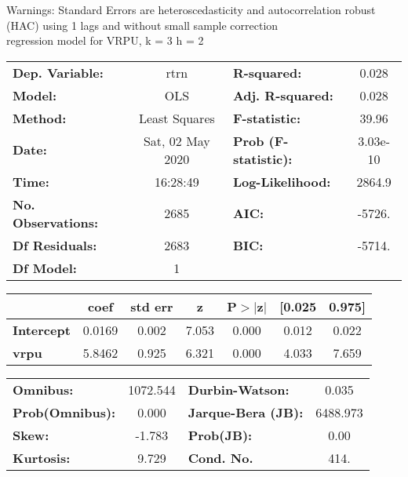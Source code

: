 Warnings: \newline
 [1] Standard Errors are heteroscedasticity and autocorrelation robust (HAC) using 1 lags and without small sample correction\\ 

regression model for VRPU, k = 3 h = 2\begin{center}
\begin{tabular}{lclc}
\toprule
\textbf{Dep. Variable:}    &       rtrn       & \textbf{  R-squared:         } &     0.028   \\
\textbf{Model:}            &       OLS        & \textbf{  Adj. R-squared:    } &     0.028   \\
\textbf{Method:}           &  Least Squares   & \textbf{  F-statistic:       } &     39.96   \\
\textbf{Date:}             & Sat, 02 May 2020 & \textbf{  Prob (F-statistic):} &  3.03e-10   \\
\textbf{Time:}             &     16:28:49     & \textbf{  Log-Likelihood:    } &    2864.9   \\
\textbf{No. Observations:} &        2685      & \textbf{  AIC:               } &    -5726.   \\
\textbf{Df Residuals:}     &        2683      & \textbf{  BIC:               } &    -5714.   \\
\textbf{Df Model:}         &           1      & \textbf{                     } &             \\
\bottomrule
\end{tabular}
\begin{tabular}{lcccccc}
                   & \textbf{coef} & \textbf{std err} & \textbf{z} & \textbf{P$> |$z$|$} & \textbf{[0.025} & \textbf{0.975]}  \\
\midrule
\textbf{Intercept} &       0.0169  &        0.002     &     7.053  &         0.000        &        0.012    &        0.022     \\
\textbf{vrpu}      &       5.8462  &        0.925     &     6.321  &         0.000        &        4.033    &        7.659     \\
\bottomrule
\end{tabular}
\begin{tabular}{lclc}
\textbf{Omnibus:}       & 1072.544 & \textbf{  Durbin-Watson:     } &    0.035  \\
\textbf{Prob(Omnibus):} &   0.000  & \textbf{  Jarque-Bera (JB):  } & 6488.973  \\
\textbf{Skew:}          &  -1.783  & \textbf{  Prob(JB):          } &     0.00  \\
\textbf{Kurtosis:}      &   9.729  & \textbf{  Cond. No.          } &     414.  \\
\bottomrule
\end{tabular}
\end{center}

